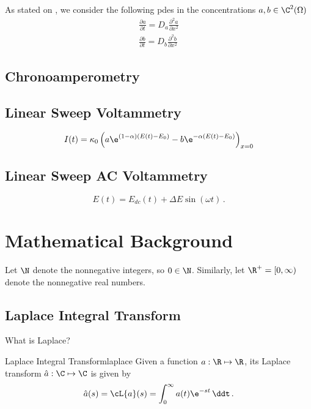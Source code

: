 \documentclass{prettytex/ox/mmsc-special-topic}
\begin{document}
  As stated on , we consider the following \gls{pde}s in the concentrations $a, b \in \C^2(\Omega)$
  \begin{align}
    \label{eq:pde-a} \frac{\partial a}{\partial t} = D_a \frac{\partial^2 a}{\partial x^2} \\
    \label{eq:pde-b} \frac{\partial b}{\partial t} = D_b \frac{\partial^2 b}{\partial x^2}
  \end{align}

  \subsection{Chronoamperometry}
  \subsection{Linear Sweep Voltammetry}
  \begin{equation}
    I(t) = \kappa_0 \left(a \e^{(1-\alpha) (E(t) - E_0)} - b \e^{-\alpha (E(t) - E_0)}\right)_{x=0}
    \label{eq:current}
  \end{equation}

  \subsection{Linear Sweep AC Voltammetry}
  \begin{equation}
    E(t) = E_{dc}(t) + \Delta E \sin(\omega t)\,.
    \label{eq:ac-potential}
  \end{equation}

  \section{Mathematical Background}
  Let $\N$ denote the nonnegative integers, so $0 \in \N$.
  Similarly, let $\R^+ = [0, \infty)$ denote the nonnegative real numbers.

  \subsection{Laplace Integral Transform}
  What is Laplace?

  \begin{definition}{Laplace Integral Transform}{laplace}
    Given a function $a: \R \mapsto \R$, its Laplace transform $\hat{a}: \C \mapsto \C$ is given by
    $$\hat{a}(s) = \cL\{a\}(s) = \int_{0}^{\infty} a(t) \e^{-st} \,\ddt\,.$$
  \end{definition}
\end{document}
